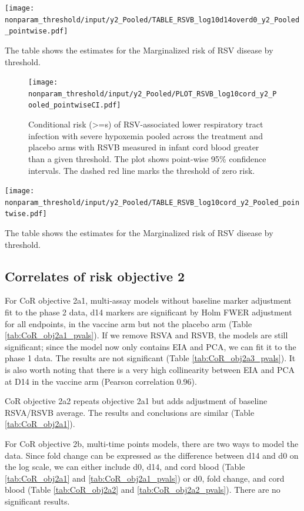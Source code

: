 \documentclass[11pt]{article}
\begin{document}
\begin{table}[H]
\centering
\texttt{[image: nonparam\_threshold/input/y2\_Pooled/TABLE\_RSVB\_log10d14overd0\_y2\_Pooled\_pointwise.pdf]}
\caption{The table shows the  estimates for the Marginalized risk of RSV disease by threshold. }
\end{table}

\begin{figure}[H]
\centering
\texttt{[image: nonparam\_threshold/input/y2\_Pooled/PLOT\_RSVB\_log10cord\_y2\_Pooled\_pointwiseCI.pdf]}
\caption{Conditional risk (>=s) of RSV-associated lower respiratory tract infection with severe hypoxemia pooled across the treatment and placebo arms with RSVB measured in infant cord blood greater than a given threshold. The plot shows point-wise 95\% confidence intervals. The dashed red line marks the threshold of zero risk.}
\label{fig:PLOT_RSVB_log10cord_y2_Pooled_pointwiseCI}
\end{figure}

\begin{table}[H]
\centering
\texttt{[image: nonparam\_threshold/input/y2\_Pooled/TABLE\_RSVB\_log10cord\_y2\_Pooled\_pointwise.pdf]}
\caption{The table shows the  estimates for the Marginalized risk of RSV disease by threshold. }
\end{table}

\hypertarget{correlates-of-risk-objective-2}{%
\subsection{Correlates of risk objective 2}\label{correlates-of-risk-objective-2}}

For CoR objective 2a1, multi-assay models without baseline marker adjustment fit to the phase 2 data, d14 markers are significant by Holm FWER adjustment for all endpoints, in the vaccine arm but not the placebo arm (Table \ref{tab:CoR_obj2a1_pvals}). If we remove RSVA and RSVB, the models are still significant; since the model now only contains EIA and PCA, we can fit it to the phase 1 data. The results are not significant (Table \ref{tab:CoR_obj2a3_pvals}). It is also worth noting that there is a very high collinearity between EIA and PCA at D14 in the vaccine arm (Pearson correlation 0.96).

CoR objective 2a2 repeats objective 2a1 but adds adjustment of baseline RSVA/RSVB average. The results and conclusions are similar (Table \ref{tab:CoR_obj2a1}).

For CoR objective 2b, multi-time points models, there are two ways to model the data. Since fold change can be expressed as the difference between d14 and d0 on the log scale, we can either include d0, d14, and cord blood (Table \ref{tab:CoR_obj2a1} and \ref{tab:CoR_obj2a1_pvals}) or d0, fold change, and cord blood (Table \ref{tab:CoR_obj2a2} and \ref{tab:CoR_obj2a2_pvals}). There are no significant results.
\end{document}

